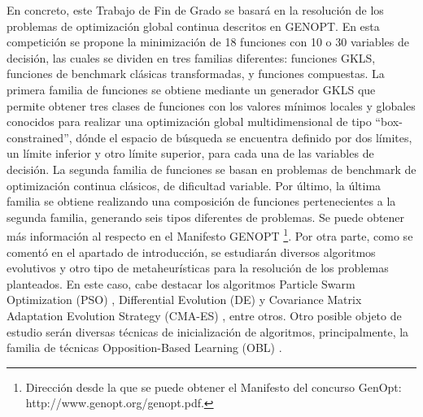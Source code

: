 En concreto, este Trabajo de Fin de Grado se basará en la resolución de los problemas de optimización global continua descritos en GENOPT. En esta competición se propone la minimización de 18 funciones con 10 o 30 variables de decisión, las cuales se dividen en tres familias diferentes: funciones GKLS, funciones de benchmark clásicas transformadas, y funciones compuestas.
La primera familia de funciones se obtiene mediante un generador GKLS \cite{GKLS} que permite obtener tres clases de funciones con los valores mínimos locales y globales conocidos para realizar una optimización global multidimensional de tipo “box-constrained”, dónde el espacio de búsqueda se encuentra definido por dos límites, un límite inferior y otro límite superior, para cada una de las variables de decisión.
La segunda familia de funciones se basan en problemas de benchmark de optimización continua clásicos, de dificultad variable.
\newline
Por último, la última familia se obtiene realizando una composición de funciones pertenecientes a la segunda familia, generando seis tipos diferentes de problemas.	
Se puede obtener más información al respecto en el Manifesto GENOPT \footnote{Dirección desde la que se puede obtener el Manifesto del concurso GenOpt: http://www.genopt.org/genopt.pdf.}.
Por otra parte, como se comentó en el apartado de introducción, se estudiarán diversos algoritmos evolutivos y otro tipo de metaheurísticas para la resolución de los problemas planteados. En este caso, cabe destacar los algoritmos Particle Swarm Optimization (PSO) \cite{GPSO}, Differential Evolution (DE) \cite{metabook} y Covariance Matrix Adaptation Evolution Strategy (CMA-ES) \cite{CMA}, entre otros. Otro posible objeto de estudio serán diversas técnicas de inicialización de algoritmos, principalmente, la familia de técnicas Opposition-Based Learning (OBL) \cite{obl2}.


